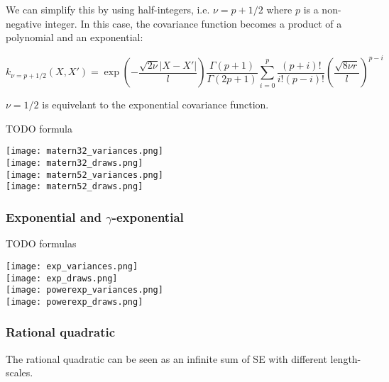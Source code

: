 We can simplify this by using half-integers, i.e. $\nu = p + 1/2$ where $p$ is a non-negative integer. In this case, the covariance function becomes a product of a polynomial and an exponential:

\begin{equation*}
    k_{\nu = p + 1/2}(X,X') = \exp \left(- \frac{\sqrt{2\nu}|X - X'|}{l} \right) \frac{\Gamma(p+1)}{\Gamma(2p+1)} \sum_{i=0}^p \frac{(p + i)!}{i!(p-i)!} \left( \frac{\sqrt{8\nu r}}{l} \right)^{p-i}
\end{equation*}

$\nu = 1/2$ is equivelant to the exponential covariance function.

TODO formula

\texttt{[image: matern32\_variances.png]} \\
\texttt{[image: matern32\_draws.png]} \\


\texttt{[image: matern52\_variances.png]} \\
\texttt{[image: matern52\_draws.png]} \\


\subsubsection{Exponential and $\gamma$-exponential}
TODO formulas 

\texttt{[image: exp\_variances.png]} \\
\texttt{[image: exp\_draws.png]} \\

\texttt{[image: powerexp\_variances.png]} \\
\texttt{[image: powerexp\_draws.png]} \\

\subsubsection{Rational quadratic}
The rational quadratic can be seen as an infinite sum of SE with different length-scales.

